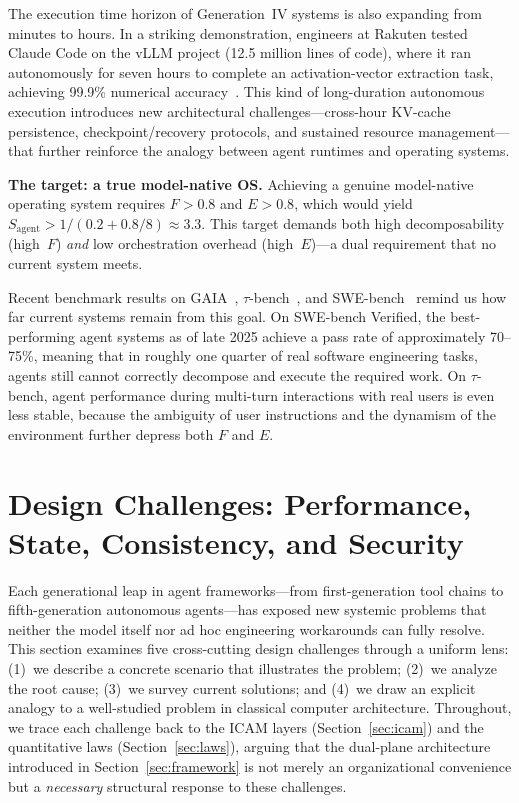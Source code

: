 \documentclass[11pt,a4paper]{article}
\begin{document}
The execution time horizon of Generation~IV systems is also expanding from minutes to hours.
In a striking demonstration, engineers at Rakuten tested Claude Code on the vLLM project (12.5 million lines of code), where it ran autonomously for seven hours to complete an activation-vector extraction task, achieving 99.9\% numerical accuracy~\cite{anthropic2026agenticreport}.
This kind of long-duration autonomous execution introduces new architectural challenges---cross-hour KV-cache persistence, checkpoint/recovery protocols, and sustained resource management---that further reinforce the analogy between agent runtimes and operating systems.

\textbf{The target: a true model-native OS.}
Achieving a genuine model-native operating system requires $F > 0.8$ and $E > 0.8$, which would yield $S_{\mathrm{agent}} > 1/(0.2 + 0.8/8) \approx 3.3$.
This target demands both high decomposability (high~$F$) \textit{and} low orchestration overhead (high~$E$)---a dual requirement that no current system meets.

Recent benchmark results on GAIA~\cite{gaia2023}, $\tau$-bench~\cite{taubench2024}, and SWE-bench~\cite{swebench2023} remind us how far current systems remain from this goal.
On SWE-bench Verified, the best-performing agent systems as of late 2025 achieve a pass rate of approximately 70--75\%, meaning that in roughly one quarter of real software engineering tasks, agents still cannot correctly decompose and execute the required work.
On $\tau$-bench, agent performance during multi-turn interactions with real users is even less stable, because the ambiguity of user instructions and the dynamism of the environment further depress both $F$ and $E$.




\section{Design Challenges: Performance, State, Consistency, and Security}
\label{sec:challenges}

Each generational leap in agent frameworks---from first-generation tool chains to fifth-generation autonomous agents---has exposed new systemic problems that neither the model itself nor ad hoc engineering workarounds can fully resolve.
This section examines five cross-cutting design challenges through a uniform lens: (1)~we describe a concrete scenario that illustrates the problem; (2)~we analyze the root cause; (3)~we survey current solutions; and (4)~we draw an explicit analogy to a well-studied problem in classical computer architecture.
Throughout, we trace each challenge back to the ICAM layers (Section~\ref{sec:icam}) and the quantitative laws (Section~\ref{sec:laws}), arguing that the dual-plane architecture introduced in Section~\ref{sec:framework} is not merely an organizational convenience but a \emph{necessary} structural response to these challenges.
\end{document}
